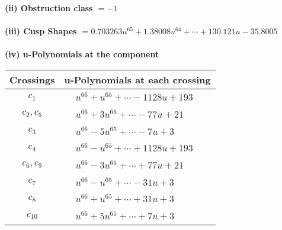 \documentclass[1p]{elsarticle_modified}
\theoremstyle{definition}
\begin{document}
\flushleft \textbf{(ii) Obstruction class $= -1$}\\~\\
\flushleft \textbf{(iii) Cusp Shapes $= 0.703263 u^{65}+1.38008 u^{64}+\cdots+130.121 u-35.8005$}\\~\\
\newpage\renewcommand{\arraystretch}{1}
\flushleft \textbf{(iv) u-Polynomials at the component}\newline \\
\begin{tabular}{m{50pt}|m{274pt}}
Crossings & \hspace{64pt}u-Polynomials at each crossing \\
\hline $$\begin{aligned}c_{1}\end{aligned}$$&$\begin{aligned}
&u^{66}+u^{65}+\cdots-1128 u+193
\end{aligned}$\\
\hline $$\begin{aligned}c_{2},c_{5}\end{aligned}$$&$\begin{aligned}
&u^{66}+3 u^{65}+\cdots-77 u+21
\end{aligned}$\\
\hline $$\begin{aligned}c_{3}\end{aligned}$$&$\begin{aligned}
&u^{66}-5 u^{65}+\cdots-7 u+3
\end{aligned}$\\
\hline $$\begin{aligned}c_{4}\end{aligned}$$&$\begin{aligned}
&u^{66}- u^{65}+\cdots+1128 u+193
\end{aligned}$\\
\hline $$\begin{aligned}c_{6},c_{9}\end{aligned}$$&$\begin{aligned}
&u^{66}-3 u^{65}+\cdots+77 u+21
\end{aligned}$\\
\hline $$\begin{aligned}c_{7}\end{aligned}$$&$\begin{aligned}
&u^{66}- u^{65}+\cdots-31 u+3
\end{aligned}$\\
\hline $$\begin{aligned}c_{8}\end{aligned}$$&$\begin{aligned}
&u^{66}+u^{65}+\cdots+31 u+3
\end{aligned}$\\
\hline $$\begin{aligned}c_{10}\end{aligned}$$&$\begin{aligned}
&u^{66}+5 u^{65}+\cdots+7 u+3
\end{aligned}$\\
\hline
\end{tabular}\\~\\
\end{document}
